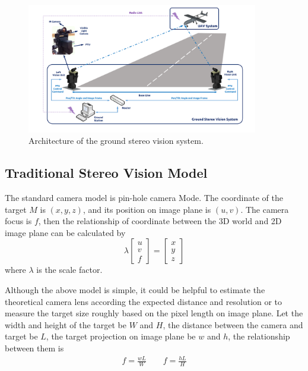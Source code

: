 \documentclass[journal,article,submit,moreauthors,pdftex,10pt,a4paper]{mdpi}
\begin{document}
\begin{figure}[!tb]
	\centering
	\includegraphics[width=0.9\textwidth]{Figs/SystemStructure2.pdf}
	\caption{Architecture of the ground stereo vision system.}
	\label{fig:SystemStructure}
\end{figure}


\subsection{Traditional Stereo Vision Model}
The standard camera model is pin-hole camera Mode. The coordinate of the target $M$ is $(x,y,z)$, and its position on image plane is $(u,v)$. The camera focus is $f$, then the relationship of coordinate between the 3D world and 2D image plane can be calculated by 
\begin{equation}
	\lambda\left[ {\begin{array}{*{20}{c}}
			u \\ 
			v \\ 
			f 
	\end{array}} \right] =\left[ {\begin{array}{*{20}{c}}
			x \\ 
			y \\ 
			z 
	\end{array}} \right]
\end{equation}
where $\lambda$ is the scale factor. 

Although the above model is simple, it could be helpful to estimate the theoretical camera lens according the expected distance and resolution or to measure the target size roughly based on the pixel length on image plane. Let the width and height of the target be $W$ and $H$, the distance between the camera and target be $L$, the target projection on image plane be $w$ and $h$, the relationship between them is  
\begin{align}
	f=\frac{wL}{W} \qquad f=\frac{hL}{H}
\end{align}
\end{document}
